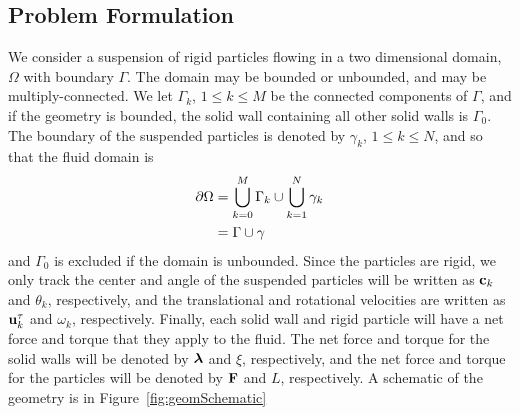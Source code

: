 \documentclass[preprint, 10pt]{elsarticle}
\begin{document}
\subsection{Problem Formulation}

We consider a suspension of rigid particles flowing in a two dimensional
domain, $\Omega$ with boundary $\Gamma$.  The domain may be bounded or
unbounded, and may be multiply-connected.  We let $\Gamma_k$, $1 \leq k
\leq M$ be the connected components of $\Gamma$, and if the geometry is
bounded, the solid wall containing all other solid walls is $\Gamma_0$.
The boundary of the suspended particles is denoted by $\gamma_k$, $1
\leq k \leq N$, and so that the fluid domain is
\begin{align*}
  {\partial}\Omega &= \bigcup_{k=0}^M \Gamma_k \cup \bigcup_{k=1}^N \gamma_k \\
  &= \Gamma \cup \gamma
\end{align*}
and $\Gamma_0$ is excluded if the domain is unbounded.  Since the
particles are rigid, we only track the center and angle of the suspended
particles will be written as ${\mathbf{c}}_k$ and $\theta_k$, respectively, and
the translational and rotational velocities are written as ${\mathbf{u}}_k^\tau$
and $\omega_k$, respectively.  Finally, each solid wall and rigid
particle will have a net force and torque that they apply to the fluid.
The net force and torque for the solid walls will be denoted by
${\boldsymbol\lambda}$ and $\xi$, respectively, and the net force and torque for the
particles will be denoted by ${\mathbf{F}}$ and $L$, respectively.  A schematic
of the geometry is in Figure~\ref{fig:geomSchematic}

%
\end{document}
